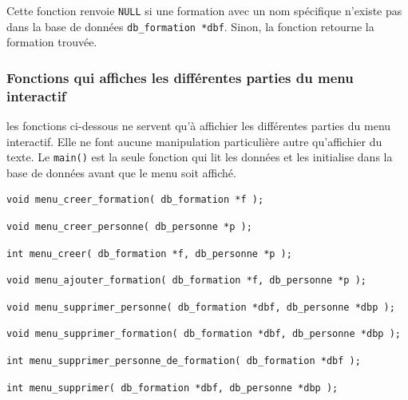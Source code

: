\documentclass[11pt]{article}
\begin{document}
Cette fonction renvoie \texttt{NULL} si une formation avec un nom spécifique n'existe pas dans la base de données \texttt{db\_formation *dbf}. Sinon, la fonction retourne la formation trouvée.

\subsubsection{Fonctions qui affiches les différentes parties du menu interactif}
les fonctions ci-dessous ne servent qu'à affichier les différentes parties du menu interactif. Elle ne font aucune manipulation particulière autre qu'affichier du texte. Le \texttt{main()} est la seule fonction qui lit les données et les initialise dans la base de données avant que le menu soit affiché.

\begin{lstlisting}[firstnumber=618]
  void menu_creer_formation( db_formation *f );
\end{lstlisting}

\begin{lstlisting}[firstnumber=786]
  void menu_creer_personne( db_personne *p );
\end{lstlisting}

\begin{lstlisting}[firstnumber=939]
  int menu_creer( db_formation *f, db_personne *p );
\end{lstlisting}

\begin{lstlisting}[firstnumber=976]
  void menu_ajouter_formation( db_formation *f, db_personne *p );
\end{lstlisting}

\begin{lstlisting}[firstnumber=1089]
  void menu_supprimer_personne( db_formation *dbf, db_personne *dbp );
\end{lstlisting}

\begin{lstlisting}[firstnumber=1168]
  void menu_supprimer_formation( db_formation *dbf, db_personne *dbp );
\end{lstlisting}

\begin{lstlisting}[firstnumber=1257]
  int menu_supprimer_personne_de_formation( db_formation *dbf );
\end{lstlisting}

\begin{lstlisting}[firstnumber=1382]
  int menu_supprimer( db_formation *dbf, db_personne *dbp );
\end{lstlisting}
\end{document}
